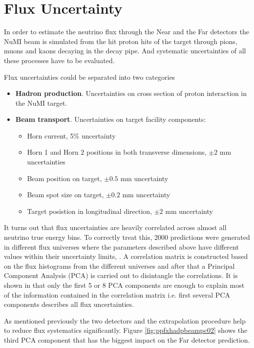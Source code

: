 \section{Flux Uncertainty}
In order to estimate the neutrino flux through the Near and the Far detectors the NuMI beam is simulated from the hit proton
hits of the target through pions, muons and kaons decaying in the decay pipe. And systematic uncertainties of all these processes
have to be evaluated.

Flux uncertainties could be separated into two categories 
\begin{itemize}
\item \textbf{Hadron production}. Uncertainties on cross section of proton interaction in the NuMI target. 
\item \textbf{Beam transport}. Uncertainties on target facility components:
\begin{itemize}
	\item Horn current, 5\% uncertainty
	\item Horn 1 and Horn 2 positions in both transverse dimensions,  $\pm2$ mm uncertainties
	\item Beam position on target, $\pm0.5$ mm uncertainty
        \item Beam spot size on target, $\pm0.2$ mm uncertainty
	\item Target posistion in longitudinal direction, $\pm2$ mm uncertainty
\end{itemize} 
\end{itemize}

It turns out that flux uncertainties are heavily correlated across almost all neutrino true energy bins. To correctly treat this,
2000 predictions were generated in different flux universes where the parameters described above have different values within their
uncertainty limits, \cite{fluxPCA_technote}. A correlation matrix is constructed based on the flux histograms from the different universes 
and after that a Principal Component Analysis (PCA) is carried out to disintangle the correlations. It is shown in 
\cite{fluxPCA_technote} that only the first 5 or 8 PCA components are enough to explain most of the information contained in the 
correlation matrix i.e. first several PCA components describes all flux uncertainties. 

As mentioned previously the two detectors and the extrapolation procedure help to reduce flux systematics significantly. Figure 
\ref{fig:ppfxhadpbeampc02} shows the third PCA component that has the biggest impact on the Far detector prediction.

